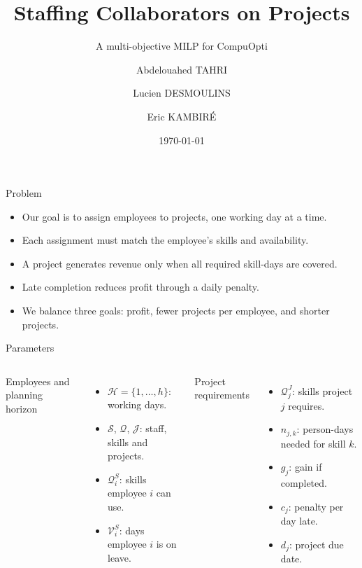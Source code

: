 \documentclass[aspectratio=169,11pt]{beamer}
\title{Staffing Collaborators on Projects}
\subtitle{A multi-objective MILP for CompuOpti}
\author{Abdelouahed TAHRI \and Lucien DESMOULINS \and Eric KAMBIR\'E}
\institute{CentraleSupélec --- Decision Modelling}
\date{\today}
\begin{document}
\begin{frame}[plain]\titlepage\end{frame}

\begin{frame}{Problem}
\begin{itemize}\setlength{\itemsep}{0.7em}
  \item \alert{Our goal} is to assign employees to projects, one working day at a time.
  \item Each assignment must match the employee's skills and availability.
  \item A project generates revenue only when all required skill-days are covered.
  \item Late completion reduces profit through a daily penalty.
  \item We balance three goals: \alert{profit}, fewer projects per employee, and shorter projects.
\end{itemize}
\end{frame}

\begin{frame}{Parameters}
\begin{columns}[T]
\alert{Employees and planning horizon}
\begin{itemize}\setlength{\itemsep}{0.5em}
\item $\mathcal H=\{1,\dots,h\}$: working days.
\item $\mathcal S$, $\mathcal Q$, $\mathcal J$: staff, skills and projects.
\item $\mathcal Q_i^S$: skills employee $i$ can use.
\item $\mathcal V_i^S$: days employee $i$ is on leave.
\end{itemize}
\alert{Project requirements}
\begin{itemize}\setlength{\itemsep}{0.5em}
\item $\mathcal Q_j^J$: skills project $j$ requires.
\item $n_{j,k}$: person-days needed for skill $k$.
\item $g_j$: gain if completed.
\item $c_j$: penalty per day late.
\item $d_j$: project due date.
\end{itemize}
\end{columns}
\end{frame}
\end{document}
